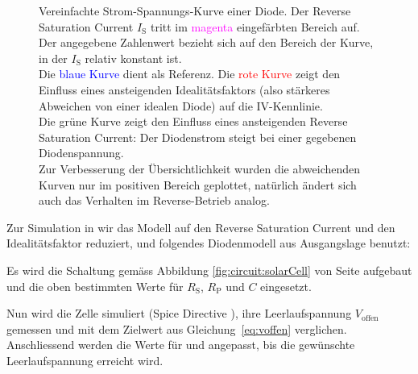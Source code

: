 \begin{figure}[h!tb]
    
    \caption{%
        Vereinfachte Strom-Spannungs-Kurve einer Diode. Der Reverse Saturation
        Current   $I_{\mathrm{S}}$   tritt   im   \textcolor{magenta}{magenta}
        eingef\"arbten Bereich auf. Der angegebene Zahlenwert bezieht sich auf
        den  Bereich  der  Kurve,  in der  $I_{\mathrm{S}}$  relativ  konstant
        ist.\protect\\
        Die    \textcolor{blue}{blaue   Kurve}    dient   als    Referenz. Die
        \textcolor{red}{rote  Kurve}  zeigt  den Einfluss  eines  ansteigenden
        Idealit\"atsfaktors  (also  st\"arkeres  Abweichen von  einer  idealen
        Diode) auf die IV-Kennlinie.\protect\\
        Die \textcolor{green!50!black}{gr\"une Kurve} zeigt den Einfluss eines
        ansteigenden  Reverse Saturation  Current: Der Diodenstrom  steigt bei
        einer gegebenen Diodenspannung.\protect\\
        Zur  Verbesserung  der  \"Ubersichtlichkeit  wurden  die  abweichenden
        Kurven nur  im positiven Bereich geplottet,  nat\"urlich \"andert sich
        auch das Verhalten im Reverse-Betrieb analog.%
    }
    \label{fig:diodeVI:IS}
\end{figure}


Zur Simulation  in   wir das Modell  auf den  Reverse Saturation
Current und  den Idealit\"atsfaktor reduziert, und  folgendes Diodenmodell aus
Ausgangslage benutzt:

\begin{center}
\end{center}

Es wird die Schaltung gem\"ass Abbildung \ref{fig:circuit:solarCell} von Seite
\pageref{fig:circuit:solarCell} aufgebaut und die  oben bestimmten Werte f\"ur
$R_{\mathrm{S}}$, $R_{\mathrm{P}}$ und $C$ eingesetzt.



Nun  wird  die  Zelle  simuliert   (Spice  Directive  ),  ihre
Leerlaufspannung  $V_{\mathrm{offen}}$  gemessen  und  mit  dem  Zielwert  aus
Gleichung~\ref{eq:voffen}  verglichen.  Anschliessend  werden die  Werte f\"ur
  und    angepasst,  bis  die  gew\"unschte  Leerlaufspannung
erreicht wird.

